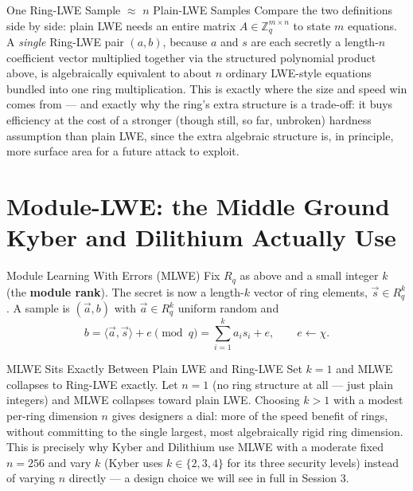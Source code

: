 \begin{rmkbox}{One Ring-LWE Sample $\approx$ $n$ Plain-LWE Samples}
Compare the two definitions side by side: plain LWE needs an entire matrix $A \in \mathbb{Z}_q^{m\times n}$ to state $m$ equations. A \emph{single} Ring-LWE pair $(a,b)$, because $a$ and $s$ are each secretly a length-$n$ coefficient vector multiplied together via the structured polynomial product above, is algebraically equivalent to about $n$ ordinary LWE-style equations bundled into one ring multiplication. This is exactly where the size and speed win comes from --- and exactly why the ring's extra structure is a trade-off: it buys efficiency at the cost of a stronger (though still, so far, unbroken) hardness assumption than plain LWE, since the extra algebraic structure is, in principle, more surface area for a future attack to exploit.
\end{rmkbox}

\section{Module-LWE: the Middle Ground Kyber and Dilithium Actually Use}
\label{sec:L2:module-lwe-the-middle-ground-kyber-and-d}

\begin{defbox}{Module Learning With Errors (MLWE)}
Fix $R_q$ as above and a small integer $k$ (the \textbf{module rank}). The secret is now a length-$k$ vector of ring elements, $\vec{s} \in R_q^k$. A sample is $(\vec a, b)$ with $\vec a \in R_q^k$ uniform random and
$$
b = \langle \vec a, \vec s \rangle + e \pmod q = \sum_{i=1}^{k} a_i s_i + e, \qquad e \leftarrow \chi.
$$
\end{defbox}

\begin{rmkbox}{MLWE Sits Exactly Between Plain LWE and Ring-LWE}
Set $k=1$ and MLWE collapses to Ring-LWE exactly. Let $n=1$ (no ring structure at all --- just plain integers) and MLWE collapses toward plain LWE. Choosing $k>1$ with a modest per-ring dimension $n$ gives designers a dial: more of the speed benefit of rings, without committing to the single largest, most algebraically rigid ring dimension. This is precisely why Kyber and Dilithium use MLWE with a moderate fixed $n=256$ and vary $k$ (Kyber uses $k \in \{2,3,4\}$ for its three security levels) instead of varying $n$ directly --- a design choice we will see in full in Session 3.
\end{rmkbox}

